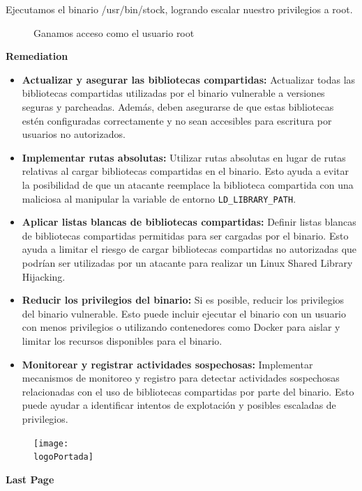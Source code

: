\documentclass[a4paper]{article} %
\newcommand{\logoPortada}{images/zipping.png}
\begin{document}
    Ejecutamos el binario /usr/bin/stock, logrando escalar nuestro privilegios a root.
    
    \begin{figure}[h]
        \centering
        \setlength{\fboxrule}{0.5pt}
        \caption{Ganamos acceso como el usuario root}
    \end{figure}

    \clearpage

    \textbf{Remediation}
    
    \begin{itemize}
        \item \textbf{Actualizar y asegurar las bibliotecas compartidas:}
        Actualizar todas las bibliotecas compartidas utilizadas por el binario vulnerable a versiones seguras y parcheadas. Además, deben asegurarse de que estas bibliotecas estén configuradas correctamente y no sean accesibles para escritura por usuarios no autorizados.
        \item \textbf{Implementar rutas absolutas:}
        Utilizar rutas absolutas en lugar de rutas relativas al cargar bibliotecas compartidas en el binario. Esto ayuda a evitar la posibilidad de que un atacante reemplace la biblioteca compartida con una maliciosa al manipular la variable de entorno \texttt{LD\_LIBRARY\_PATH}.
        \item \textbf{Aplicar listas blancas de bibliotecas compartidas:}
        Definir listas blancas de bibliotecas compartidas permitidas para ser cargadas por el binario. Esto ayuda a limitar el riesgo de cargar bibliotecas compartidas no autorizadas que podrían ser utilizadas por un atacante para realizar un Linux Shared Library Hijacking.
        \item \textbf{Reducir los privilegios del binario:}
        Si es posible, reducir los privilegios del binario vulnerable. Esto puede incluir ejecutar el binario con un usuario con menos privilegios o utilizando contenedores como Docker para aislar y limitar los recursos disponibles para el binario.
        \item \textbf{Monitorear y registrar actividades sospechosas:}
        Implementar mecanismos de monitoreo y registro para detectar actividades sospechosas relacionadas con el uso de bibliotecas compartidas por parte del binario. Esto puede ayudar a identificar intentos de explotación y posibles escaladas de privilegios.
    \end{itemize}

    \clearpage

    \null
    \vfill
    \hfill
    \begin{figure}[h]
        \centering
        \texttt{[image: \\logoPortada]}
    \end{figure}
    \hfill
    \null
    \vfill
    \null

    \null
    \hfill
    \textbf{\Huge Last Page}
    \hfill
    \null
    \vfill
    \vfill
    \null
    
\end{document}
